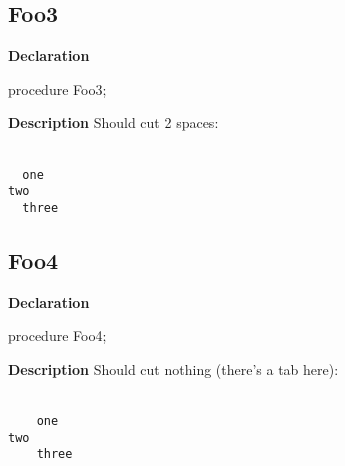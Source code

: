 \documentclass{report}
\newif\ifpdf
\begin{document}
\subsection*{Foo3}
\fi
\label{ok_longcode_indentation-Foo3}
\begin{list}{}{
\setlength{\itemindent}{0cm}
\setlength{\listparindent}{0cm}
\setlength{\leftmargin}{\evensidemargin}
\addtolength{\leftmargin}{\tmplength}
\settowidth{\labelsep}{X}
\addtolength{\leftmargin}{\labelsep}
\setlength{\labelwidth}{\tmplength}
}
\item[\textbf{Declaration}\hfill]
\ifpdf
\begin{flushleft}
\fi
\begin{ttfamily}
procedure Foo3;\end{ttfamily}

\ifpdf
\end{flushleft}
\fi

\par
\item[\textbf{Description}]
Should cut 2 spaces:

\texttt{\\\nopagebreak[3]
~~one\\\nopagebreak[3]
two\\\nopagebreak[3]
~~three\\
}

\end{list}
\ifpdf
\subsection*{\large{\textbf{Foo4}}\normalsize\hspace{1ex}\hrulefill}
\else
\subsection*{Foo4}
\fi
\label{ok_longcode_indentation-Foo4}
\begin{list}{}{
\setlength{\itemindent}{0cm}
\setlength{\listparindent}{0cm}
\setlength{\leftmargin}{\evensidemargin}
\addtolength{\leftmargin}{\tmplength}
\settowidth{\labelsep}{X}
\addtolength{\leftmargin}{\labelsep}
\setlength{\labelwidth}{\tmplength}
}
\item[\textbf{Declaration}\hfill]
\ifpdf
\begin{flushleft}
\fi
\begin{ttfamily}
procedure Foo4;\end{ttfamily}

\ifpdf
\end{flushleft}
\fi

\par
\item[\textbf{Description}]
Should cut nothing (there's a tab here):

\texttt{\\\nopagebreak[3]
~~~~one\\\nopagebreak[3]
	two\\\nopagebreak[3]
~~~~three\\
}

\end{list}
\ifpdf
\end{document}
